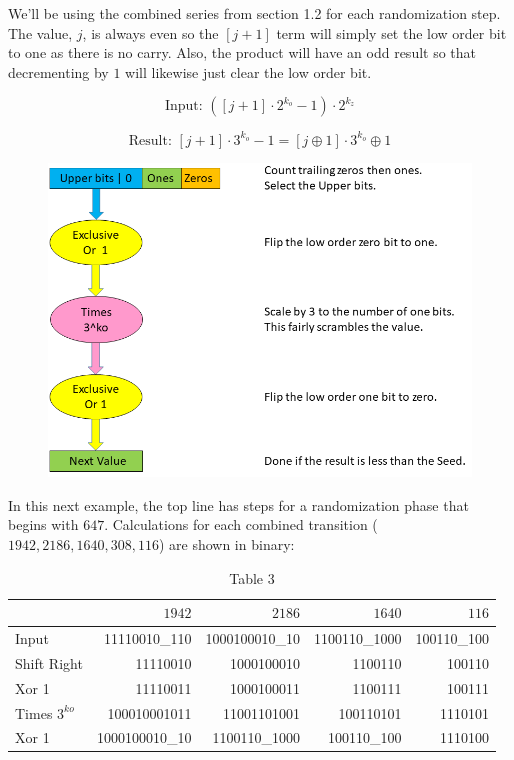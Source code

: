 \documentclass[preprint]{sigplanconf}
\begin{document}
We'll be using the combined series from section 1.2 for each randomization step. The value, $j$, is always even so the $[j + 1]$ term will simply set the low order bit to one as there is no carry. Also, the product will have an odd result so that decrementing by $1$ will likewise just clear the low order bit.

\[
    \text{Input: } ([j + 1] \cdot 2^{k_o} - 1) \cdot 2^{k_z}
\]

\[
    \text{Result: } [j + 1] \cdot 3^{k_o} - 1 = [j \oplus 1] \cdot 3^{k_o} \oplus 1
\]



\begin{figure}
    \includegraphics[width=\textwidth]{collatz_even}
\end{figure}

\newpage

In this next example, the top line has steps for a randomization phase that begins with $647$. Calculations for each combined transition ($1942, 2186, 1640, 308, 116$) are shown in binary:

\begin{table}
    \begin{center}
    \begin{tabular}{|l|r|r|r|r|}
        \hline
                       & \textbf{$1942$} & \textbf{$2186$} & \textbf{$1640$} & \textbf{$116$} \\
        \hline
        Input          & 11110010\_110   & 1000100010\_10  & 1100110\_1000   & 100110\_100    \\
        \hline
        Shift Right    & 11110010        & 1000100010      & 1100110         & 100110         \\
        \hline
        Xor 1          & 11110011        & 1000100011      & 1100111         & 100111         \\
        \hline
        Times $3^{ko}$ & 100010001011    & 11001101001     & 100110101       & 1110101        \\
        \hline
        Xor 1          & 1000100010\_10  & 1100110\_1000   & 100110\_100     & 1110100        \\
        \hline
    \end{tabular}
    \caption{Table 3}
    \label{tab-3}
\end{center}
\end{table}
\end{document}
